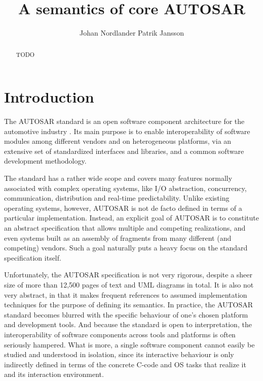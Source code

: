 \documentclass[10pt,conference]{IEEEtran}
\title{A semantics of core AUTOSAR}
\author{Johan Nordlander \quad\quad Patrik Jansson}
\affil{Chalmers University of Technology}
\begin{document}
\maketitle
\begin{abstract}
TODO

\end{abstract}

\section{Introduction}
\label{sec:Intro}

The AUTOSAR standard is an open software component architecture for the automotive industry \cite{AR:Homepage}. Its main purpose is to enable interoperability of software modules among different vendors and on heterogeneous platforms, via an extensive set of standardized interfaces and libraries, and a common software development methodology.

The standard has a rather wide scope and covers many features normally associated with complex operating systems, like I/O abstraction, concurrency, communication, distribution and real-time predictability. Unlike existing operating systems, however, AUTOSAR is not de facto defined in terms of a particular implementation. Instead, an explicit goal of AUTOSAR is to constitute an abstract specification that allows multiple and competing realizations, and even systems built as an assembly of fragments from many different (and competing) vendors. Such a goal naturally puts a heavy focus on the standard specification itself.

Unfortunately, the AUTOSAR specification is not very rigorous, despite a sheer size of more than 12,500 pages of text and UML diagrams in total. It is also not very abstract, in that it makes frequent references to assumed implementation techniques for the purpose of defining its semantics. In practice, the AUTOSAR standard becomes blurred with the specific behaviour of one's chosen platform and development tools. And because the standard is open to interpretation, the interoperability of software components across tools and platforms is often seriously hampered. What is more, a single software component cannot easily be studied and understood in isolation, since its interactive behaviour is only indirectly defined in terms of the concrete C-code and OS tasks that realize it and its interaction environment.
\end{document}
